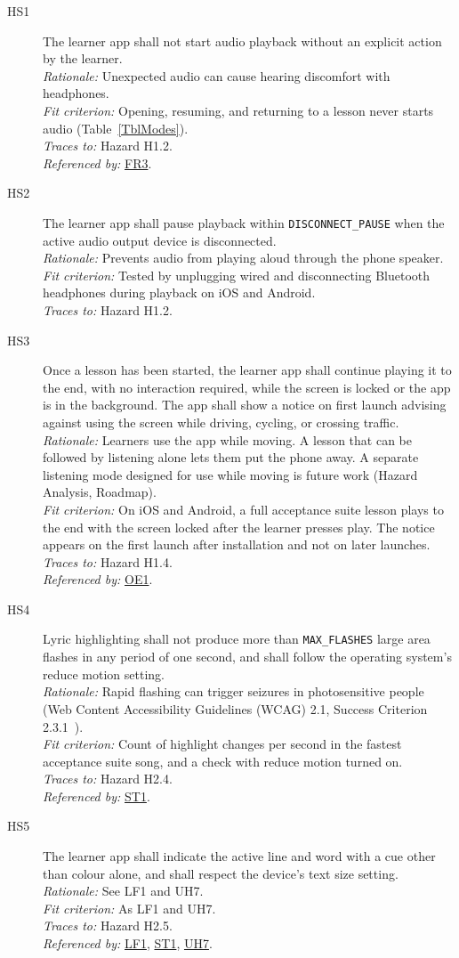 \documentclass[12pt]{article}
\newcommand{\cn}[1]{\texttt{#1}}
\newcommand{\rat}[1]{\\\textit{Rationale:} #1}
\newcommand{\fit}[1]{\\\textit{Fit criterion:} #1}
\newcommand{\trace}[1]{\\\textit{Traces to:} #1}
\newcommand{\usedby}[1]{\\\textit{Referenced by:} #1}
\newcommand{\reqdef}[1]{\hypertarget{req:#1}{#1}}
\newcommand{\req}[1]{\hyperlink{req:#1}{#1}}
\begin{document}
\begin{description}
\item[\reqdef{HS1}] The learner app shall not start audio playback without an explicit
action by the learner.
\rat{Unexpected audio can cause hearing discomfort with headphones.}
\fit{Opening, resuming, and returning to a lesson never starts audio
(Table~\ref{TblModes}).}
\trace{Hazard H1.2.}
\usedby{\req{FR3}.}

\item[\reqdef{HS2}] The learner app shall pause playback within \cn{DISCONNECT\_PAUSE}
when the active audio output device is disconnected.
\rat{Prevents audio from playing aloud through the phone speaker.}
\fit{Tested by unplugging wired and disconnecting Bluetooth headphones during
playback on iOS and Android.}
\trace{Hazard H1.2.}

\item[\reqdef{HS3}] Once a lesson has been started, the learner app shall continue
playing it to the end, with no interaction required, while the screen is
locked or the app is in the background. The app shall show a notice on first
launch advising against using the screen while driving, cycling, or crossing
traffic.
\rat{Learners use the app while moving. A lesson that can be followed by
listening alone lets them put the phone away. A separate listening mode
designed for use while moving is future work (Hazard Analysis, Roadmap).}
\fit{On iOS and Android, a full acceptance suite lesson plays to the end with
the screen locked after the learner presses play. The notice appears on the
first launch after installation and not on later launches.}
\trace{Hazard H1.4.}
\usedby{\req{OE1}.}

\item[\reqdef{HS4}] Lyric highlighting shall not produce more than \cn{MAX\_FLASHES}
large area flashes in any period of one second, and shall follow the operating
system's reduce motion setting.
\rat{Rapid flashing can trigger seizures in photosensitive people (Web Content
Accessibility Guidelines (WCAG) 2.1,
Success Criterion 2.3.1~\cite{WCAG21, WCAG231}).}
\fit{Count of highlight changes per second in the fastest acceptance suite
song, and a check with reduce motion turned on.}
\trace{Hazard H2.4.}
\usedby{\req{ST1}.}

\item[\reqdef{HS5}] The learner app shall indicate the active line and word with a cue
other than colour alone, and shall respect the device's text size setting.
\rat{See LF1 and UH7.}
\fit{As LF1 and UH7.}
\trace{Hazard H2.5.}
\usedby{\req{LF1}, \req{ST1}, \req{UH7}.}


\end{description}
\end{document}
